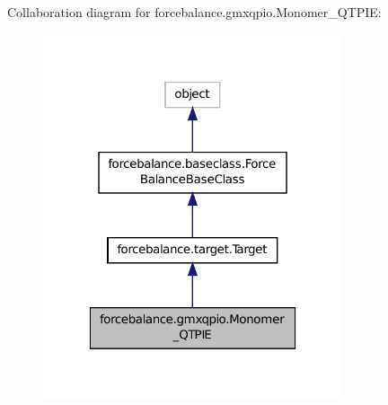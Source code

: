 Collaboration diagram for forcebalance.\-gmxqpio.\-Monomer\-\_\-\-Q\-T\-P\-I\-E\-:\nopagebreak
\begin{figure}[H]
\begin{center}
\leavevmode
\includegraphics[width=250pt]{classforcebalance_1_1gmxqpio_1_1Monomer__QTPIE__coll__graph}
\end{center}
\end{figure}
